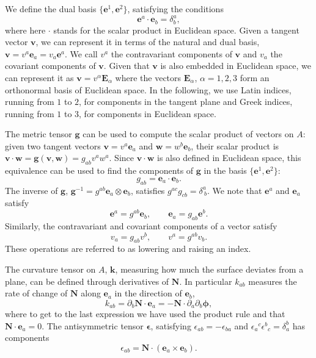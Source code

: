 We define the dual basis $\{\bm{e}^1,\bm{e}^2\}$, satisfying the conditions
\begin{equation} \label{2_II}
	\bm{e}^a \cdot \bm{e}_b = \delta^a_b,
\end{equation}
where here $\cdot$ stands for the scalar product in Euclidean space. 
Given a tangent vector $\bm{v}$, we can represent it in terms of the natural and dual basis, $\bm{v}=v^a\bm{e}_a=v_a\bm{e}^a$. We call $v^a$ the contravariant components of $\bm{v}$ and $v_a$ the covariant components of $\bm{v}$. Given that $\bm{v}$ is also embedded in Euclidean space, we can represent it as $\bm{v}=v^\alpha \bm{E}_\alpha$ where the vectors $\bm{E}_\alpha$, $\alpha=1,2,3$ form an orthonormal basis of Euclidean space. In the following, we use Latin indices, running from $1$ to $2$, for components in the tangent plane and Greek indices, running from $1$ to $3$, for components in Euclidean space. 

The metric tensor $\bm{g}$ can be used to compute the scalar product of vectors on $A$: given two tangent vectors $\bm{v} = v^a \bm{e}_a$ and  $\bm{w} = w^b \bm{e}_b$, their scalar product is $\bm{v}\cdot\bm{w}=\bm{g}(\bm{v},\bm{w})=g_{ab} v^a w^a$. Since $\bm{v}\cdot\bm{w}$ is also defined in Euclidean space, this equivalence can be used to find the components of $\bm{g}$ in the basis $\{\bm{e}^1,\bm{e}^2\}$:
\begin{equation} \label{eq::metric}
	g_{ab} = \bm{e}_a \cdot \bm{e}_b.
\end{equation}
The inverse of $\bm{g}$, $\bm{g}^{-1}=g^{ab}\bm{e}_a\otimes\bm{e}_b$, satisfies $g^{ac}g_{cb} = \delta^a_{~b}$. We note that $\bm{e}^a$ and $\bm{e}_a$ satisfy
\begin{equation} \label{2_II}
	\bm{e}^a = g^{ab}\bm{e}_b,\qquad \bm{e}_a = g_{ab}\bm{e}^b.
\end{equation}
Similarly, the contravariant and covariant components of a vector satisfy 
\begin{equation}
	v_a = g_{ab} v^b,\qquad v^a = g^{ab} v_b. 
\end{equation}
These operations are referred to as lowering and raising an index.

The curvature tensor on $A$, $\bm{k}$, measuring how much the surface deviates from a plane, can be defined through derivatives of $\bm{N}$. In particular $k_{ab}$ measures the rate of change of $\bm{N}$ along $\bm{e}_a$ in the direction of $\bm{e}_b$,
\begin{equation} \label{3_II}
	k_{ab} = \partial_b \bm{N} \cdot \bm{e}_a = -\bm{N} \cdot  \partial_a  \partial_b \bm{\phi},
\end{equation}
where to get to the last expression we have used the product rule and that $\bm{N} \cdot \bm{e}_a=0$.
The antisymmetric tensor $\bm{\epsilon}$, satisfying $\epsilon_{ab}=-\epsilon_{ba}$ and $\epsilon_a{}^c \epsilon^b{}_c=\delta_a^b$ has components
\begin{equation} \label{4_II}
	\epsilon_{ab} = \bm{N} \cdot (\bm{e}_a \times \bm{e}_b).
\end{equation}

